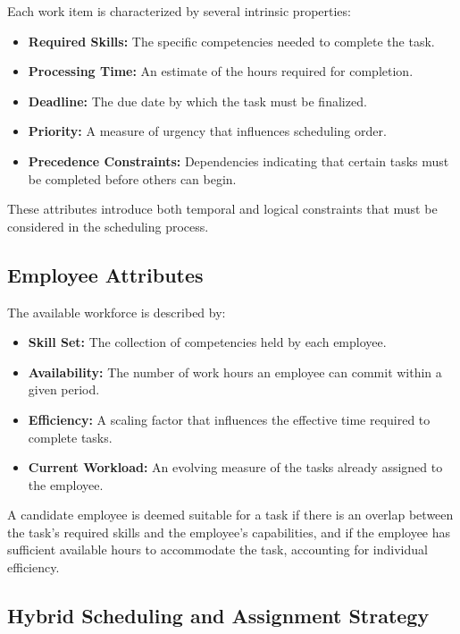 \documentclass[%
aip,
cp,  %
reprint
]{revtex4-2}
\begin{document}
	Each work item is characterized by several intrinsic properties:
	\begin{itemize}
		\item \textbf{Required Skills:} The specific competencies needed to complete
		the task.
		
		\item \textbf{Processing Time:} An estimate of the hours required for
		completion.
		
		\item \textbf{Deadline:} The due date by which the task must be finalized.
		
		\item \textbf{Priority:} A measure of urgency that influences scheduling
		order.
		
		\item \textbf{Precedence Constraints:} Dependencies indicating that certain
		tasks must be completed before others can begin.
	\end{itemize}
	These attributes introduce both temporal and logical constraints that must be considered
	in the scheduling process.
	
	\subsection{\label{subsec:employee}Employee Attributes}
	
	The available workforce is described by:
	\begin{itemize}
		\item \textbf{Skill Set:} The collection of competencies held by each
		employee.
		
		\item \textbf{Availability:} The number of work hours an employee can commit
		within a given period.
		
		\item \textbf{Efficiency:} A scaling factor that influences the effective
		time required to complete tasks.
		
		\item \textbf{Current Workload:} An evolving measure of the tasks already
		assigned to the employee.
	\end{itemize}
	A candidate employee is deemed suitable for a task if there is an overlap between
	the task's required skills and the employee's capabilities, and if the
	employee has sufficient available hours to accommodate the task, accounting for
	individual efficiency.
	
	\subsection{\label{subsec:strategy}Hybrid Scheduling and Assignment Strategy}
	
\end{document}
